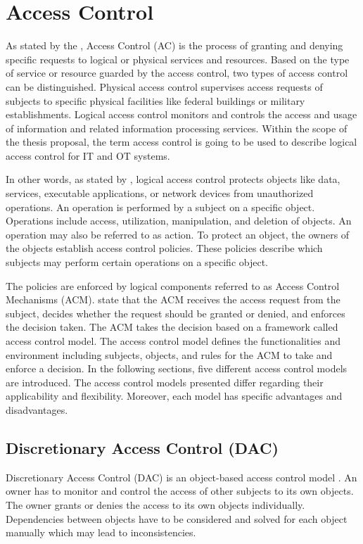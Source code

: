\section{Access Control}
\label{sec:accesscontrol}
As stated by the \citeauthor{NIST2022} \cite{NIST2022}, Access Control (AC) is the process of granting and denying specific requests to logical or physical services and resources.
Based on the type of service or resource guarded by the access control, two types of access control can be distinguished.
Physical access control supervises access requests of subjects to specific physical facilities like federal buildings or military establishments.
Logical access control monitors and controls the access and usage of information and related information processing services.
Within the scope of the thesis proposal, the term access control is going to be used to describe logical access control for IT and OT systems.

In other words, as stated by \citeauthor{Hu2014} \cite{Hu2014}, logical access control protects objects like data, services, executable applications, or network devices from unauthorized operations.
An operation is performed by a subject on a specific object.
Operations include access, utilization, manipulation, and deletion of objects.
An operation may also be referred to as action.
To protect an object, the owners of the objects establish access control policies.
These policies describe which subjects may perform certain operations on a specific object.

The policies are enforced by logical components referred to as Access Control Mechanisms (ACM).
\citeauthor{Hu2014} \cite{Hu2014} state that the ACM receives the access request from the subject, decides whether the request should be granted or denied, and enforces the decision taken.
The ACM takes the decision based on a framework called access control model.
The access control model defines the functionalities and environment including subjects, objects, and rules for the ACM to take and enforce a decision.
In the following sections, five different access control models are introduced.
The access control models presented differ regarding their applicability and flexibility.
Moreover, each model has specific advantages and disadvantages.

\subsection{Discretionary Access Control (DAC)}
Discretionary Access Control (DAC) is an object-based access control model \cite{Eckert2023}.
An owner has to monitor and control the access of other subjects to its own objects.
The owner grants or denies the access to its own objects individually.
Dependencies between objects have to be considered and solved for each object manually which may lead to inconsistencies.

